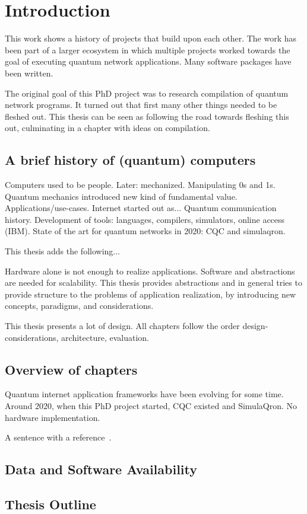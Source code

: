 \chapter{Introduction}
\label{chp:intro}

This work shows a history of projects that build upon each other.
The work has been part of a larger ecosystem in which multiple projects worked towards the goal of executing quantum network applications.
Many software packages have been written.

The original goal of this PhD project was to research compilation of quantum network programs.
It turned out that first many other things needed to be fleshed out.
This thesis can be seen as following the road towards fleshing this out, culminating in a chapter with ideas on compilation.

\section{A brief history of (quantum) computers}
Computers used to be people.
Later: mechanized. Manipulating 0s and 1s.
Quantum mechanics introduced new kind of fundamental value.
Applications/use-cases.
Internet started out as...
Quantum communication history.
Development of tools: languages, compilers, simulators, online access (IBM).
State of the art for quantum networks in 2020: CQC and simulaqron.

This thesis adds the following...




Hardware alone is not enough to realize applications.
Software and abstractions are needed for scalability.
This thesis provides abstractions and in general tries to provide structure to the problems of application realization,
by introducing new concepts, paradigms, and considerations.


This thesis presents a lot of design.
All chapters follow the order design-considerations, architecture, evaluation.

\section{Overview of chapters}
Quantum internet application frameworks have been evolving for some time.
Around 2020, when this PhD project started, CQC existed and SimulaQron.
No hardware implementation.

\lipsum[40-50]
A sentence with a reference~\cite{dahlberg_2022_netqasm}.


\section{Data and Software Availability}
\lipsum[51]


\section{Thesis Outline}
\lipsum[52]


\begin{xstretch}
\printbibliography[heading=subbibintoc,title={References},notcategory=noprint]
\end{xstretch}
